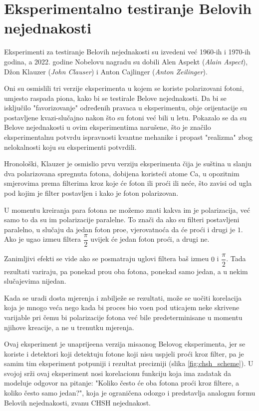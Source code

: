 \chapter{Eksperimentalno testiranje Belovih\\nejednakosti}


Eksperimenti za testiranje Belovih nejednakosti su izvedeni ve\' c 1960-ih i 1970-ih godina, a 2022. godine Nobelovu
nagradu su dobili Alen Aspekt (\textit{Alain Aspect}), D\v zon Klauzer (\textit{John Clauser}) i Anton Cajlinger (\textit{Anton Zeilinger}).

Oni su osmislili tri verzije eksperimenta u kojem se koriste polarizovani fotoni, umjesto raspada piona,
kako bi se testirale Belove nejednakosti. Da bi se isklju\v cilo "favorizovanje" određenih pravaca u eksperimentu, obje orijentacije su
postavljene kvazi-slu\v cajno nakon \v sto su fotoni ve\' c bili u letu.
Pokazalo se da su Belove nejednakosti u ovim eksperimentima naru\v sene, \v sto je zna\v cilo eksperimentalnu potvrdu
ispravnosti kvantne mehanike i propast "realizma" zbog nelokalnosti koju su eksperimenti potvrdili.

Hronolo\v ski, Klauzer je osmislio prvu verziju eksperimenta \v cija je 
su\v stina u slanju dva polarizovana spregnuta fotona, dobijena koriste\' ci atome Ca, u opozitnim smjerovima prema filterima kroz koje
\' ce foton ili pro\' ci ili ne\' ce, \v sto zavisi od ugla pod kojim je filter postavljen
i kako je foton polarizovan.

U momentu kreiranja para fotona ne mo\v zemo znati kakva im je polarizacija, ve\' c samo to da su im
polarizacije paralelne. To zna\v ci da ako su filteri postavljeni paralelno, u slu\v caju da jedan foton pro\dj e, vjerovatno\' ca da \' ce pro\' ci i drugi je $1$.
Ako je ugao izme\dj u filtera $\dfrac{\pi}{2}$ uvijek \' ce jedan foton pro\' ci, a drugi ne.

Zanimljivi efekti se vide ako se posmatraju uglovi filtera ba\v s izme\dj u $0$ i $\dfrac{\pi}{2}$. Tada rezultati variraju,
pa ponekad pro\dj u oba fotona, ponekad samo jedan, a u nekim slu\v cajevima nijedan.

Kada se uradi dosta mjerenja i zabilje\v ze se rezultati, mo\v ze se uo\v citi korelacija koja je mnogo ve\'ca nego kada bi
proces bio vo\dj en pod uticajem neke skrivene varijable pri \v cemu bi polarizacije fotona ve\'c bile predeterminisane u momentu njihove kreacije, a ne u trenutku mjerenja.

Ovaj eksperiment je unaprije\dj ena verzija misaonog Belovog eksperimenta, jer se koriste i detektori koji
detektuju fotone koji nisu uspjeli pro\'ci kroz filter, pa je samim tim eksperiment potpuniji i rezultat precizniji (slika \ref{fig:chsh_scheme}).
U svojoj sr\v zi ovaj eksperiment nosi korelacionu funkciju koja ima zadatak da modeluje odgovor na pitanje: "Koliko
\v cesto \'ce oba fotona pro\' ci kroz filtere, a koliko \v cesto samo jedan?", koja je ograni\v cena odozgo i predstavlja analognu formu
Belovih nejednakosti, zvanu CHSH nejednakost.

